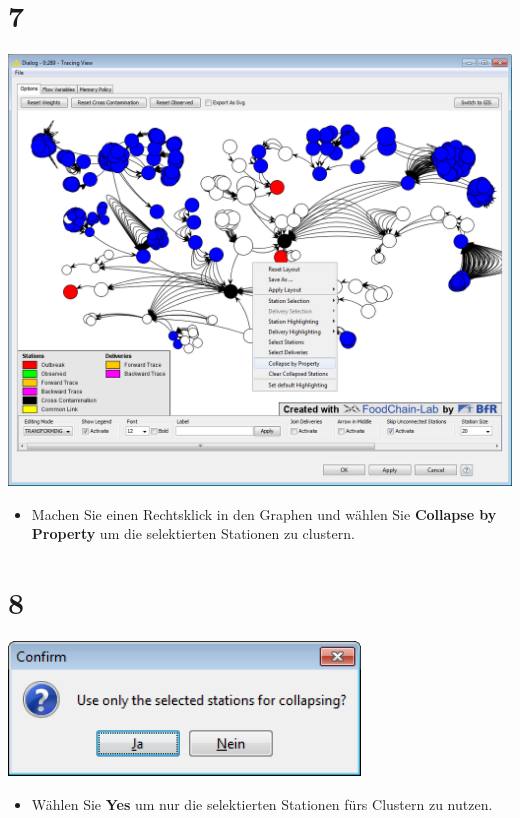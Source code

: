 \documentclass{beamer}
\begin{document}
\section{7}
\begin{frame}
	\begin{center}
  		\includegraphics[height=0.6\textheight]{7.png}
	\end{center}
	\begin{itemize}
		\item Machen Sie einen Rechtsklick in den Graphen und wählen Sie \textbf{Collapse by Property} um die selektierten Stationen zu clustern.
	\end{itemize}
\end{frame}

\section{8}
\begin{frame}
	\begin{center}
  		\includegraphics[width=0.7\textwidth]{8.png}
	\end{center}
	\begin{itemize}
		\item Wählen Sie \textbf{Yes} um nur die selektierten Stationen fürs Clustern zu nutzen.
	\end{itemize}
\end{frame}
\end{document}
